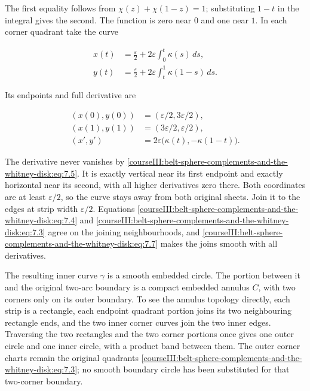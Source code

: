 The first equality follows from \(\chi(z)+\chi(1-z)=1\); substituting \(1-t\) in the integral gives the second. The function is zero near \(0\) and one near \(1\). In each corner quadrant take the curve

\begin{equation}
\begin{aligned}
x(t)&=\frac{\varepsilon}{2}
       +2\varepsilon\int_0^t\kappa(s)\,ds,\\
y(t)&=\frac{\varepsilon}{2}
       +2\varepsilon\int_t^1\kappa(1-s)\,ds.
\end{aligned}
\label{courseIII:belt-sphere-complements-and-the-whitney-disk:eq:7.6}
\end{equation}

Its endpoints and full derivative are

\begin{equation}
\begin{aligned}
(x(0),y(0))&=(\varepsilon/2,3\varepsilon/2),\\
(x(1),y(1))&=(3\varepsilon/2,\varepsilon/2),\\
(x',y')&=2\varepsilon\bigl(\kappa(t),-\kappa(1-t)\bigr).
\end{aligned}
\label{courseIII:belt-sphere-complements-and-the-whitney-disk:eq:7.7}
\end{equation}

The derivative never vanishes by \eqref{courseIII:belt-sphere-complements-and-the-whitney-disk:eq:7.5}. It is exactly vertical near its first endpoint and exactly horizontal near its second, with all higher derivatives zero there. Both coordinates are at least \(\varepsilon/2\), so the curve stays away from both original sheets. Join it to the edges at strip width \(\varepsilon/2\). Equations \eqref{courseIII:belt-sphere-complements-and-the-whitney-disk:eq:7.4} and \eqref{courseIII:belt-sphere-complements-and-the-whitney-disk:eq:7.3} agree on the joining neighbourhoods, and \eqref{courseIII:belt-sphere-complements-and-the-whitney-disk:eq:7.7} makes the joins smooth with all derivatives.

The resulting inner curve \(\gamma\) is a smooth embedded circle. The portion between it and the original two-arc boundary is a compact embedded annulus \(C\), with two corners only on its outer boundary. To see the annulus topology directly, each strip is a rectangle, each endpoint quadrant portion joins its two neighbouring rectangle ends, and the two inner corner curves join the two inner edges. Traversing the two rectangles and the two corner portions once gives one outer circle and one inner circle, with a product band between them. The outer corner charts remain the original quadrants \eqref{courseIII:belt-sphere-complements-and-the-whitney-disk:eq:7.3}; no smooth boundary circle has been substituted for that two-corner boundary.

